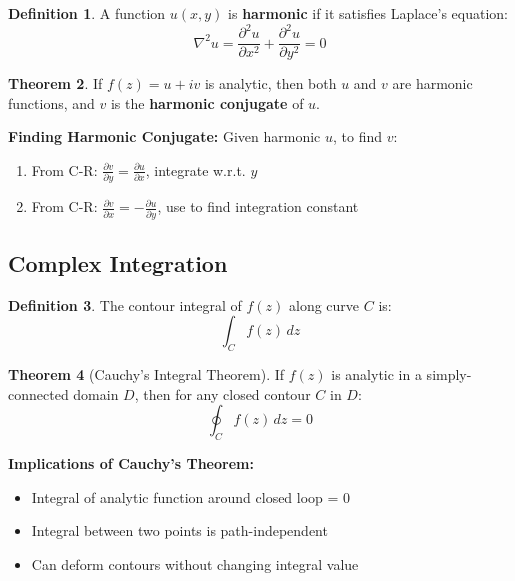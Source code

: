 \documentclass[12pt,a4paper]{article}
\theoremstyle{definition}
\newtheorem{theorem}{Theorem}[section]
\newtheorem{definition}[theorem]{Definition}
\begin{document}
\begin{definition}
A function $u(x,y)$ is \textbf{harmonic} if it satisfies Laplace's equation:
\[
\nabla^2 u = \frac{\partial^2 u}{\partial x^2} + \frac{\partial^2 u}{\partial y^2} = 0
\]
\end{definition}

\begin{theorem}
If $f(z) = u + iv$ is analytic, then both $u$ and $v$ are harmonic functions, and $v$ is the \textbf{harmonic conjugate} of $u$.
\end{theorem}

\begin{tipbox}
\textbf{Finding Harmonic Conjugate:}
Given harmonic $u$, to find $v$:
\begin{enumerate}
    \item From C-R: $\frac{\partial v}{\partial y} = \frac{\partial u}{\partial x}$, integrate w.r.t. $y$
    \item From C-R: $\frac{\partial v}{\partial x} = -\frac{\partial u}{\partial y}$, use to find integration constant
\end{enumerate}
\end{tipbox}

\subsection{Complex Integration}

\begin{definition}
The contour integral of $f(z)$ along curve $C$ is:
\[
\int_C f(z)\,dz
\]
\end{definition}

\begin{theorem}[Cauchy's Integral Theorem]
If $f(z)$ is analytic in a simply-connected domain $D$, then for any closed contour $C$ in $D$:
\[
\oint_C f(z)\,dz = 0
\]
\end{theorem}

\begin{importantbox}
\textbf{Implications of Cauchy's Theorem:}
\begin{itemize}
    \item Integral of analytic function around closed loop = 0
    \item Integral between two points is path-independent
    \item Can deform contours without changing integral value
\end{itemize}
\end{importantbox}
\end{document}
